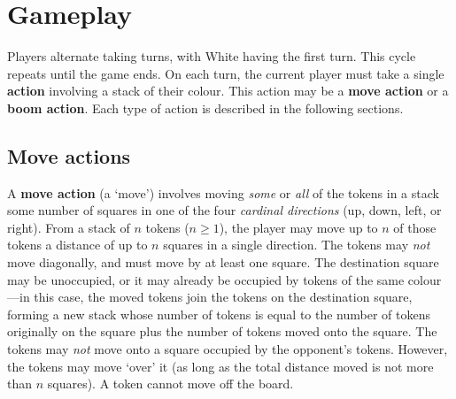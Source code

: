\documentclass[]{article}
\begin{document}
\newpage

\section*{Gameplay}

Players alternate taking turns, with White having the first turn.
This cycle repeats until the game ends. On each turn, the current
player must take a single \textbf{action} involving a stack of their
colour. This action may be a \textbf{move action} or a
\textbf{boom action}. Each type of action is described in the
following sections.

\subsection*{Move actions}

A \textbf{move action} (a `move') involves moving \emph{some} or \emph{all}
of the tokens in a stack some number of squares in one of the four
\emph{cardinal directions} (up, down, left, or right).
From a stack of $n$ tokens ($n \geq 1$), the player may move up to $n$ of
those tokens a distance of up to $n$ squares in a single direction.
The tokens may \emph{not} move diagonally, and must move by at least one
square.
%
The destination square may be unoccupied, or it may already be occupied by
tokens of the same colour---in this case, the moved tokens join the tokens
on the destination square, forming a new stack whose number of tokens is
equal to the number of tokens originally on the square plus the number of
tokens moved onto the square.
%
The tokens may \emph{not} move onto a square occupied by the opponent's
tokens. However, the tokens may move `over' it (as long as the total
distance moved is not more than $n$ squares). A token cannot move off the
board.
\end{document}
